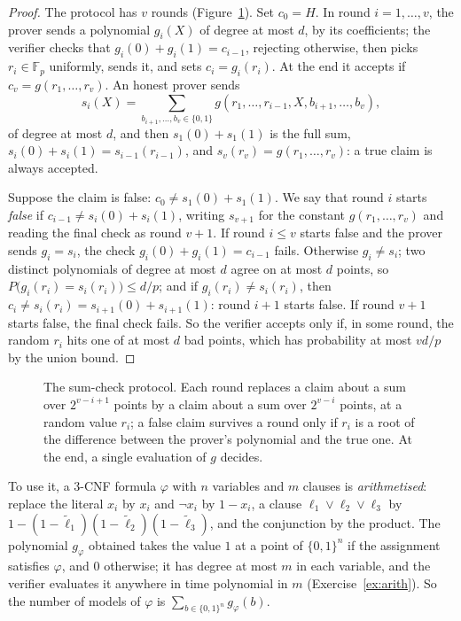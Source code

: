 \begin{proof}
The protocol has $v$ rounds (Figure~\ref{fig:sumcheck}). Set $c_0=H$. In round $i=1,\dots,v$, the prover sends a polynomial $g_i(X)$ of degree at most $d$, by its coefficients; the verifier checks that $g_i(0)+g_i(1)=c_{i-1}$, rejecting otherwise, then picks $r_i\in\mathbb F_p$ uniformly, sends it, and sets $c_i=g_i(r_i)$. At the end it accepts if $c_v=g(r_1,\dots,r_v)$. An honest prover sends
\[
s_i(X)=\sum_{b_{i+1},\dots,b_v\in\{0,1\}}g(r_1,\dots,r_{i-1},X,b_{i+1},\dots,b_v),
\]
of degree at most $d$, and then $s_1(0)+s_1(1)$ is the full sum, $s_i(0)+s_i(1)=s_{i-1}(r_{i-1})$, and $s_v(r_v)=g(r_1,\dots,r_v)$: a true claim is always accepted.

Suppose the claim is false: $c_0\ne s_1(0)+s_1(1)$. We say that round $i$ starts \emph{false} if $c_{i-1}\ne s_i(0)+s_i(1)$, writing $s_{v+1}$ for the constant $g(r_1,\dots,r_v)$ and reading the final check as round $v+1$. If round $i\le v$ starts false and the prover sends $g_i=s_i$, the check $g_i(0)+g_i(1)=c_{i-1}$ fails. Otherwise $g_i\ne s_i$; two distinct polynomials of degree at most $d$ agree on at most $d$ points, so $P\bigl(g_i(r_i)=s_i(r_i)\bigr)\le d/p$; and if $g_i(r_i)\ne s_i(r_i)$, then $c_i\ne s_i(r_i)=s_{i+1}(0)+s_{i+1}(1)$: round $i+1$ starts false. If round $v+1$ starts false, the final check fails. So the verifier accepts only if, in some round, the random $r_i$ hits one of at most $d$ bad points, which has probability at most $vd/p$ by the union bound.
\end{proof}

\begin{figure}[ht]
\centering
{}
\caption{The sum-check protocol. Each round replaces a claim about a sum over $2^{v-i+1}$ points by a claim about a sum over $2^{v-i}$ points, at a random value $r_i$; a false claim survives a round only if $r_i$ is a root of the difference between the prover's polynomial and the true one. At the end, a single evaluation of $g$ decides.}
\label{fig:sumcheck}
\end{figure}

To use it, a 3-CNF formula $\varphi$ with $n$ variables and $m$ clauses is \emph{arithmetised}: replace the literal $x_i$ by $x_i$ and $\neg x_i$ by $1-x_i$, a clause $\ell_1\lor\ell_2\lor\ell_3$ by $1-(1-\tilde\ell_1)(1-\tilde\ell_2)(1-\tilde\ell_3)$, and the conjunction by the product. The polynomial $g_\varphi$ obtained takes the value $1$ at a point of $\{0,1\}^n$ if the assignment satisfies $\varphi$, and $0$ otherwise; it has degree at most $m$ in each variable, and the verifier evaluates it anywhere in time polynomial in $m$ (Exercise~\ref{ex:arith}). So the number of models of $\varphi$ is $\sum_{b\in\{0,1\}^n}g_\varphi(b)$.

